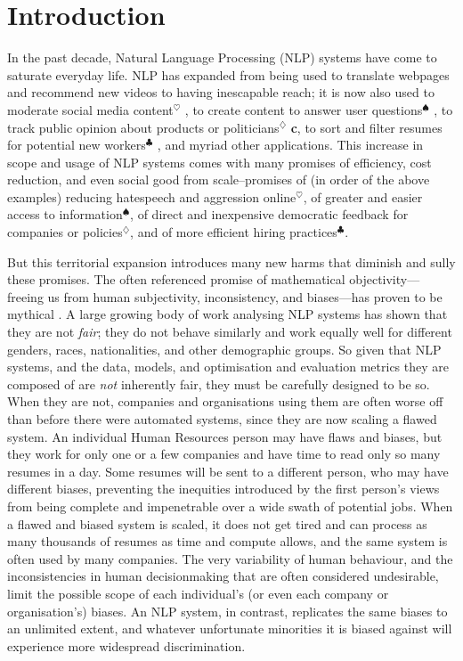 \chapter{Introduction} \label{chapter:introduction}
In the past decade, Natural Language Processing (NLP) systems have come to saturate everyday life. NLP has expanded from being used to translate webpages and recommend new videos to having inescapable reach; it is now also used to moderate social media content$^{\heartsuit}$ \citep{}, to create content to answer user questions$^{\spadesuit}$ \citep{}, to track public opinion about products or politicians$^{\diamondsuit}$ \citep{} \textbf{c}, to sort and filter resumes for potential new workers$^{\clubsuit}$ \cite{}, and myriad other applications.
This increase in scope and usage of NLP systems comes with many promises of efficiency, cost reduction, and even social good from scale--promises of (in order of the above examples) reducing hatespeech and aggression online$^{\heartsuit}$, of greater and easier access to information$^{\spadesuit}$, of direct and inexpensive democratic feedback for companies or policies$^{\diamondsuit}$, and of more efficient hiring practices$^{\clubsuit}$.

But this territorial expansion introduces many new harms that diminish and sully these promises.  
The often referenced promise of mathematical objectivity---freeing us from human subjectivity, inconsistency, and biases---has proven to be mythical \citep{oneil2016weapons}. A large growing body of work analysing NLP systems has shown that they are not \textit{fair}; they do not behave similarly and work equally well for different genders, races, nationalities, and other demographic groups. So given that NLP systems, and the data, models, and optimisation and evaluation metrics they are composed of are \textit{not} inherently fair, they must be carefully designed to be so. When they are not, companies and organisations using them are often worse off than before there were automated systems, since they are now scaling a flawed system. An individual Human Resources person may have flaws and biases, but they work for only one or a few companies and have time to read only so many resumes in a day. Some resumes will be sent to a different person, who may have different biases, preventing the inequities introduced by the first person's views from being complete and impenetrable over a wide swath of potential jobs. When a flawed and biased system is scaled, it does not get tired and can process as many thousands of resumes as time and compute allows, and the same system is often used by many companies. The very variability of human behaviour, and the inconsistencies in human decisionmaking that are often considered undesirable, limit the possible scope of each individual's (or even each company or organisation's) biases. An NLP system, in contrast, replicates the same biases to an unlimited extent, and whatever unfortunate minorities it is biased against will experience more widespread discrimination.

